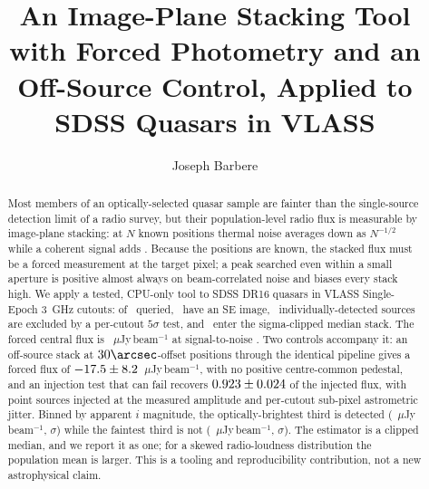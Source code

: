 \documentclass[twocolumn]{aastex631}
\begin{document}
\title{An Image-Plane Stacking Tool with Forced Photometry and an Off-Source Control,
Applied to SDSS Quasars in VLASS}

\author[0009-0008-3289-4447]{Joseph Barbere}

\begin{abstract}
Most members of an optically-selected quasar sample are fainter than the single-source detection limit
of a radio survey, but their population-level radio flux is measurable by image-plane stacking: at $N$
known positions thermal noise averages down as $N^{-1/2}$ while a coherent signal adds
\citep{white2007,karim2011}. Because the positions are known, the stacked flux must be a forced
measurement at the target pixel; a peak searched even within a small aperture is positive almost
always on beam-correlated noise and biases every stack high. We apply a tested, CPU-only tool to
SDSS DR16 quasars \citep{lyke2020} in VLASS Single-Epoch \citep{lacy2020} 3~GHz cutouts: of
\stNqueried\ queried, \stNwithCutout\ have an SE image, \stNdetExcl\ individually-detected sources
are excluded by a per-cutout $5\sigma$ test, and \stN\ enter the sigma-clipped median stack. The
forced central flux is \stFlux~$\mu$Jy\,beam$^{-1}$ at signal-to-noise \stSNR. Two controls
accompany it: an off-source stack at $30\arcsec$-offset positions through the identical pipeline
gives a forced flux of $-17.5\pm8.2$~$\mu$Jy\,beam$^{-1}$, with no positive
centre-common pedestal, and an injection test that can fail recovers
$0.923\pm0.024$ of the injected flux, with point sources injected at the measured
amplitude and per-cutout sub-pixel astrometric jitter.
Binned by apparent $i$ magnitude, the optically-brightest third is detected
(\stBrightFlux~$\mu$Jy\,beam$^{-1}$, \stBrightSNR$\sigma$) while the faintest third is not
(\stFaintFlux~$\mu$Jy\,beam$^{-1}$, \stFaintSNR$\sigma$). The estimator is a clipped median, and we
report it as one; for a skewed radio-loudness distribution the population mean is larger. This is a
tooling and reproducibility contribution, not a new astrophysical claim.
\end{abstract}

\end{document}
